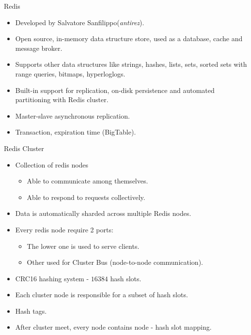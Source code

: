 \documentclass{beamer}
\begin{document}
\begin{frame}{Redis}
    \begin{itemize}
        \pause\item Developed by Salvatore Sanfilippo(\textit{antirez}).
        \pause\item Open source, in-memory data structure store, used as a database, cache and message broker.
        \pause\item Supports other data structures like strings, hashes, lists, sets, sorted sets with range queries, bitmaps, hyperloglogs.
        \pause\item Built-in support for replication, on-disk persistence and automated partitioning with Redis cluster.
        \pause\item Master-slave asynchronous replication.
        \pause\item Transaction, expiration time (BigTable).
    \end{itemize}
\end{frame}

\begin{frame}{Redis Cluster}
    \begin{itemize}
        \pause\item Collection of redis nodes
            \begin{itemize}
                \pause\item Able to communicate among themselves.
                \pause\item Able to respond to requests collectively.
            \end{itemize}
        \pause\item Data is automatically sharded across multiple Redis nodes.
        \pause\item Every redis node require 2 ports:
            \begin{itemize}
                \pause\item The lower one is used to serve clients.
                \pause\item Other used for Cluster Bus (node-to-node communication).
            \end{itemize}
        \pause\item CRC16 hashing system - $16384$ hash slots.
        \pause\item Each cluster node is responsible for a subset of hash slots.
        \pause\item Hash tags.
        \pause\item After cluster meet, every node contains node - hash slot mapping.
    \end{itemize}
\end{frame}
\end{document}
